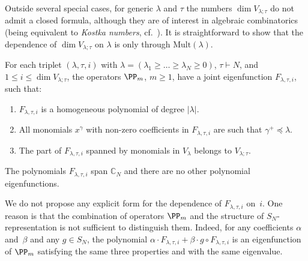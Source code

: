 Outside several special cases, for generic $\lambda$ and $\tau$ the numbers $\dim V_{\lambda;\tau}$ do not admit a closed formula, although they are of interest in algebraic combinatorics (being equivalent to \emph{Kostka numbers}, cf.\ \cite[Section I.6]{macdonald1998symmetric}). It is straightforward to show that the dependence of $\dim V_{\lambda;\tau}$ on $\lambda$ is only through $\mathrm{Mult}(\lambda)$.


\begin{theorem}\label{Theorem_classification_of_ef}
 For each triplet $(\lambda,\tau,i)$ with $\lambda=(\lambda_1\ge \dots\ge \lambda_N\ge 0)$, $\tau\vdash N$, and $1\le i \le \dim V_{\lambda;\tau}$, the operators $\PP_m$, $m\ge 1$, have a joint eigenfunction $F_{\lambda,\tau,i}$, such that:
 \begin{enumerate}
  \item $F_{\lambda,\tau,i}$ is a homogeneous polynomial of degree $|\lambda|$.
  \item All monomials $x^{\gamma}$ with non-zero coefficients in $F_{\lambda,\tau,i}$ are such that $\gamma^+\preceq \lambda$.
  \item The part of $F_{\lambda,\tau,i}$ spanned by monomials in $V_\lambda$ belongs to $V_{\lambda;\tau}$.
 \end{enumerate}
 The polynomials $F_{\lambda,\tau,i}$ span $\mathbb C_N$ and there are no other polynomial eigenfunctions.
\end{theorem}
\begin{rema}
 We do not propose any explicit form for the dependence of $F_{\lambda,\tau,i}$ on~$i$. One reason is that the combination of operators $\PP_m$ and the structure of $S_N$-representation is not sufficient to distinguish them. Indeed, for any coefficients $\alpha$ and~$\beta$ and any $g\in S_N$, the polynomial $\alpha \cdot F_{\lambda,\tau,i} +\beta \cdot g \circ F_{\lambda,\tau,i}$ is an eigenfunction of $\PP_m$ satisfying the same three properties and with the same eigenvalue.
\end{rema}
